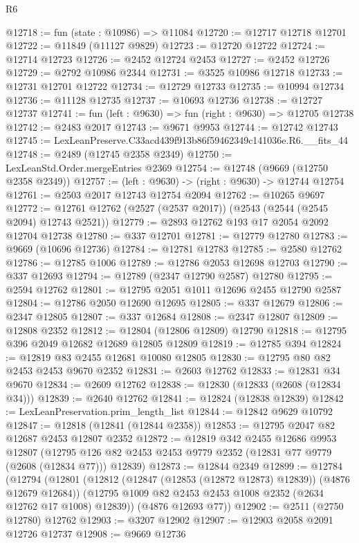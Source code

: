 \begin{lexlean}{R6}
\begin{coremodule}
@12718 := fun (state : @10986) => @11084
@12720 := @12717 @12718 @12701
@12722 := @11849 (@11127 @9829)
@12723 := @12720 @12722
@12724 := @12714 @12723
@12726 := @2452 @12724 @2453
@12727 := @2452 @12726
@12729 := @2792 @10986 @2344
@12731 := @3525 @10986 @12718
@12733 := @12731 @12701 @12722
@12734 := @12729 @12733
@12735 := @10994 @12734
@12736 := @11128 @12735
@12737 := @10693 @12736
@12738 := @12727 @12737
@12741 := fun (left : @9630) => fun (right : @9630) => @12705 @12738
@12742 := @2483 @2017
@12743 := @9671 @9953
@12744 := @12742 @12743
@12745 := LexLeanPreserve.C33acd439f913b86f59462349c141036e.R6.__fits_44
@12748 := @2489 (@12745 @2358 @2349)
@12750 := LexLeanStd.Order.mergeEntries @2369
@12754 := @12748 (@9669 (@12750 @2358 @2349))
@12757 := (left : @9630) -> (right : @9630) -> @12744 @12754
@12761 := @2503 @2017 @12743 @12754 @2094
@12762 := @10265 @9697
@12772 := @12761 @12762 (@2527 (@2537 @2017)) (@2543 (@2544 (@2545 @2094) @12743 @2521))
@12779 := @2893 @12762 @193 @17 @2054 @2092 @12704 @12738
@12780 := @337 @12701
@12781 := @12779 @12780
@12783 := @9669 (@10696 @12736)
@12784 := @12781 @12783
@12785 := @2580 @12762
@12786 := @12785 @1006
@12789 := @12786 @2053 @12698 @12703
@12790 := @337 @12693
@12794 := @12789 (@2347 @12790 @2587) @12780
@12795 := @2594 @12762
@12801 := @12795 @2051 @1011 @12696 @2455 @12790 @2587
@12804 := @12786 @2050 @12690 @12695
@12805 := @337 @12679
@12806 := @2347 @12805
@12807 := @337 @12684
@12808 := @2347 @12807
@12809 := @12808 @2352
@12812 := @12804 (@12806 @12809) @12790
@12818 := @12795 @396 @2049 @12682 @12689 @12805 @12809
@12819 := @12785 @394
@12824 := @12819 @83 @2455 @12681 @10080 @12805
@12830 := @12795 @80 @82 @2453 @2453 @9670 @2352
@12831 := @2603 @12762
@12833 := @12831 @34 @9670
@12834 := @2609 @12762
@12838 := @12830 (@12833 (@2608 (@12834 @34)))
@12839 := @2640 @12762
@12841 := @12824 (@12838 @12839)
@12842 := LexLeanPreservation.prim_length_list
@12844 := @12842 @9629 @10792
@12847 := @12818 (@12841 (@12844 @2358))
@12853 := @12795 @2047 @82 @12687 @2453 @12807 @2352
@12872 := @12819
    @342
    @2455
    @12686
    @9953
    @12807
    (@12795 @126 @82 @2453 @2453 @9779 @2352 (@12831 @77 @9779 (@2608 (@12834 @77))) @12839)
@12873 := @12844 @2349
@12899 := @12784
    (@12794
      (@12801
        (@12812 (@12847 (@12853 (@12872 @12873) @12839)) (@4876 @12679 @12684))
        (@12795 @1009 @82 @2453 @2453 @1008 @2352 (@2634 @12762 @17 @1008) @12839))
      (@4876 @12693 @77))
@12902 := @2511 (@2750 @12780) @12762
@12903 := @3207 @12902
@12907 := @12903 @2058 @2091 @12726 @12737
@12908 := @9669 @12736

\end{coremodule}
\end{lexlean}
